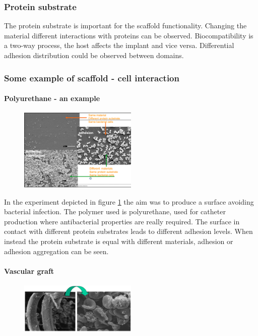 		\subsubsection{Protein substrate}
		The protein substrate is important for the scaffold functionality.
		Changing the material different interactions with proteins can be observed.
		Biocompatibility is a two-way process, the host affects the implant and vice versa.
		Differential adhesion distribution could be observed between domains.

		\subsubsection{Some example of scaffold - cell interaction}

			\paragraph{Polyurethane - an example}

			\begin{figure}[h]
				\centering
				\includegraphics[width=0.5\textwidth]{polyu}
				\caption{\label{fig:polyu}}
			\end{figure}

			In the experiment depicted in figure \ref{fig:polyu} the aim was to produce a surface avoiding bacterial infection.
			The polymer used is polyurethane, used for catheter production where antibacterial properties are really required.
			The surface in contact with different protein substrates leads to different adhesion levels.
			When instead the protein substrate is equal with different materials, adhesion or adhesion aggregation can be seen.

			\paragraph{Vascular graft}

			\begin{figure}[h]
				\includegraphics[width=0.5\textwidth]{vascular}
				\centering
				\caption{\label{fig:vascular}}
			\end{figure}

